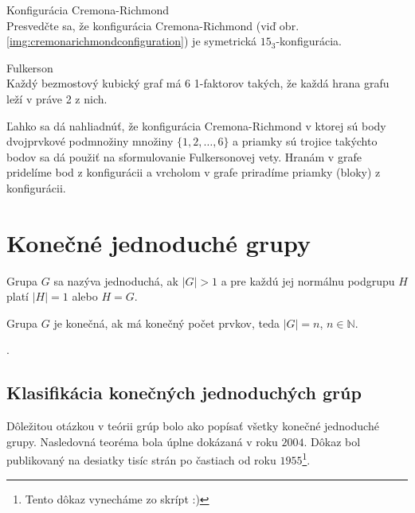 
\begin{exercise}{Konfigurácia Cremona-Richmond}\\
	\label{ex:cremonarichmond153}
	Presvedčte sa, že konfigurácia Cremona-Richmond (viď obr. \ref{img:cremonarichmondconfiguration}) je symetrická $15_3$-konfigurácia. 
\end{exercise}

\begin{hypothesis} {Fulkerson}\\
	Každý bezmostový kubický graf má 6 1-faktorov takých, že každá hrana grafu leží v práve 2 z nich.
\end{hypothesis}

Ľahko sa dá nahliadnúť, že konfigurácia Cremona-Richmond v ktorej sú body dvojprvkové podmnožiny množiny $\{1, 2, \dots, 6\}$ a priamky sú trojice takýchto bodov sa dá použiť na sformulovanie Fulkersonovej vety. Hranám v grafe pridelíme bod z konfigurácii a vrcholom v grafe priradíme priamky (bloky) z konfigurácii.

\section{Konečné jednoduché grupy}

\begin{definition}
	Grupa $G$ sa nazýva jednoduchá, ak $\lvert G\rvert > 1$ a pre každú jej normálnu podgrupu $H$ platí $\lvert H \rvert = 1$ alebo $H = G$.
\end{definition}

\begin{definition}
Grupa $G$ je konečná, ak má konečný počet prvkov, teda $\lvert G \rvert = n$, $n \in \mathbb{N}$.
\end{definition}.

\subsection{Klasifikácia konečných jednoduchých grúp}

Dôležitou otázkou v teórii grúp bolo ako popísať všetky konečné jednoduché grupy. Nasledovná teoréma bola úplne dokázaná v roku $2004$. Dôkaz bol publikovaný na desiatky tisíc strán po častiach od roku $1955$\footnote{Tento dôkaz vynecháme zo skrípt :)}.

